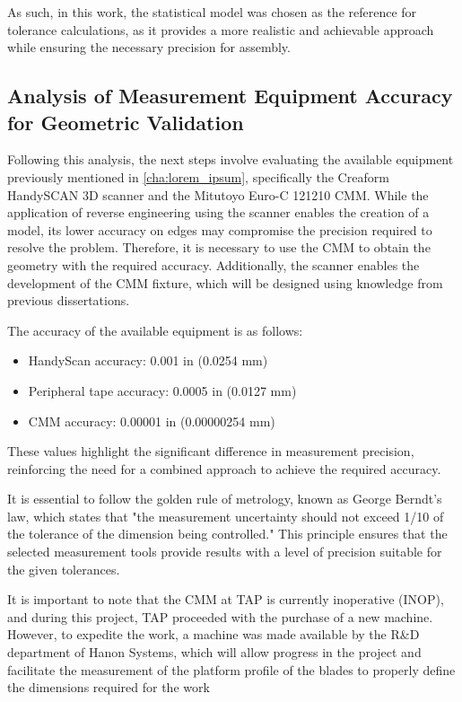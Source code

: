 As such, in this work, the statistical model was chosen as the reference for tolerance calculations, as it provides a more realistic and achievable approach while ensuring the necessary precision for assembly.

\subsection{Analysis of Measurement Equipment Accuracy for Geometric Validation}
\label{subsec:equipment_validation}

Following this analysis, the next steps involve evaluating the available equipment previously mentioned in \ref{cha:lorem_ipsum}, specifically the Creaform HandySCAN 3D scanner and the Mitutoyo Euro-C 121210 \gls{CMM}. While the application of reverse engineering using the scanner enables the creation of a model, its lower accuracy on edges may compromise the precision required to resolve the problem. Therefore, it is necessary to use the CMM to obtain the geometry with the required accuracy. Additionally, the scanner enables the development of the CMM fixture, which will be designed using knowledge from previous dissertations.

The accuracy of the available equipment is as follows:  

\begin{itemize}
    \item HandyScan accuracy: 0.001 in (0.0254 mm)
    \item Peripheral tape accuracy: 0.0005 in (0.0127 mm)
    \item CMM accuracy: 0.00001 in (0.00000254 mm)
\end{itemize}

These values highlight the significant difference in measurement precision, reinforcing the need for a combined approach to achieve the required accuracy.

It is essential to follow the golden rule of metrology, known as George Berndt's law, which states that "the measurement uncertainty should not exceed 1/10 of the tolerance of the dimension being controlled." This principle ensures that the selected measurement tools provide results with a level of precision suitable for the given tolerances.

It is important to note that the CMM at TAP is currently inoperative (INOP), and during this project, TAP proceeded with the purchase of a new machine. However, to expedite the work, a machine was made available by the R\&D department of Hanon Systems, which will allow progress in the project and facilitate the measurement of the platform profile of the blades to properly define the dimensions required for the work

